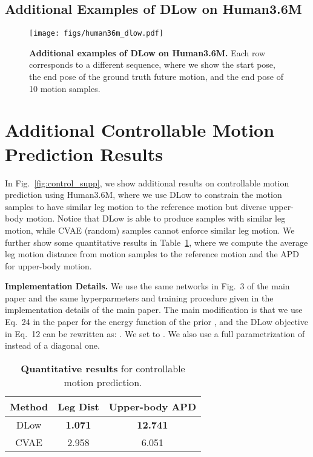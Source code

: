 \documentclass[runningheads]{llncs}
\begin{document}
\subsection{Additional Examples of DLow on Human3.6M}
\begin{figure}[ht!]
    \centering
    \texttt{[image: figs/human36m\_dlow.pdf]}
    \caption{\textbf{Additional examples of DLow on Human3.6M.} Each row corresponds to a different sequence, where we show the start pose, the end pose of the ground truth future motion, and the end pose of 10 motion samples.}
    \label{fig:supp_h36m}
\end{figure}

\clearpage
\section{Additional Controllable Motion Prediction Results}
\label{sec:control_res}
In Fig.~\ref{fig:control_supp}, we show additional results on controllable motion prediction using Human3.6M, where we use DLow to constrain the motion samples to have similar leg motion to the reference motion but diverse upper-body motion. Notice that DLow is able to produce samples with similar leg motion, while CVAE (random) samples cannot enforce similar leg motion. We further show some quantitative results in Table~\ref{table:control}, where we compute the average leg motion distance from motion samples to the reference motion and the APD for upper-body motion.

\vspace{1mm}\noindent\textbf{Implementation Details.}
We use the same networks in Fig.~3 of the main paper and the same hyperparmeters and training procedure given in the implementation details of the main paper. The main modification is that we use Eq.~24 in the paper for the energy function  of the prior , and the DLow objective in Eq.~12 can be rewritten as: . We set  to . We also use a full parametrization of  instead of a diagonal one.

\begin{table}[ht!]
\footnotesize
\centering
\vspace{-5mm}
\begin{tabular}{c@{\hskip 2mm}c@{\hskip 2mm}c}
\toprule
Method & Leg Dist  & Upper-body APD  \\ \midrule
DLow & \textbf{1.071} & \textbf{12.741} \\  
CVAE & 2.958 & 6.051 \\  
\bottomrule
\end{tabular}
\vspace{2mm}
\caption{\textbf{Quantitative results} for controllable motion prediction.}
\label{table:control}
\vspace{-10mm}
\end{table}
\end{document}
